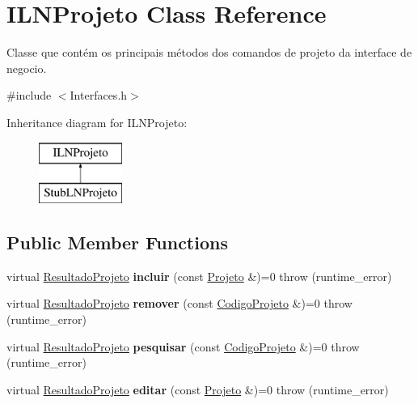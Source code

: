 \hypertarget{class_i_l_n_projeto}{}\section{I\+L\+N\+Projeto Class Reference}
\label{class_i_l_n_projeto}


Classe que contém os principais métodos dos comandos de projeto da interface de negocio.  




{\ttfamily \#include $<$Interfaces.\+h$>$}

Inheritance diagram for I\+L\+N\+Projeto\+:\begin{figure}[H]
\begin{center}
\leavevmode
\includegraphics[height=2.000000cm]{class_i_l_n_projeto}
\end{center}
\end{figure}
\subsection*{Public Member Functions}
\begin{DoxyCompactItemize}
\item 
\hypertarget{class_i_l_n_projeto_a6b97553e8adf3ec40fcb1de1da64cac1}{}\label{class_i_l_n_projeto_a6b97553e8adf3ec40fcb1de1da64cac1} 
virtual \hyperlink{class_resultado_projeto}{Resultado\+Projeto} {\bfseries incluir} (const \hyperlink{class_projeto}{Projeto} \&)=0  throw (runtime\+\_\+error)
\item 
\hypertarget{class_i_l_n_projeto_af30c088be5531dc06966b3a8d0ff06ed}{}\label{class_i_l_n_projeto_af30c088be5531dc06966b3a8d0ff06ed} 
virtual \hyperlink{class_resultado_projeto}{Resultado\+Projeto} {\bfseries remover} (const \hyperlink{class_codigo_projeto}{Codigo\+Projeto} \&)=0  throw (runtime\+\_\+error)
\item 
\hypertarget{class_i_l_n_projeto_ad656d7f8a4f62281b561b69b5e59e914}{}\label{class_i_l_n_projeto_ad656d7f8a4f62281b561b69b5e59e914} 
virtual \hyperlink{class_resultado_projeto}{Resultado\+Projeto} {\bfseries pesquisar} (const \hyperlink{class_codigo_projeto}{Codigo\+Projeto} \&)=0  throw (runtime\+\_\+error)
\item 
\hypertarget{class_i_l_n_projeto_af8636a4d2e2fc7f72514eb8d1792feb9}{}\label{class_i_l_n_projeto_af8636a4d2e2fc7f72514eb8d1792feb9} 
virtual \hyperlink{class_resultado_projeto}{Resultado\+Projeto} {\bfseries editar} (const \hyperlink{class_projeto}{Projeto} \&)=0  throw (runtime\+\_\+error)
\end{DoxyCompactItemize}


